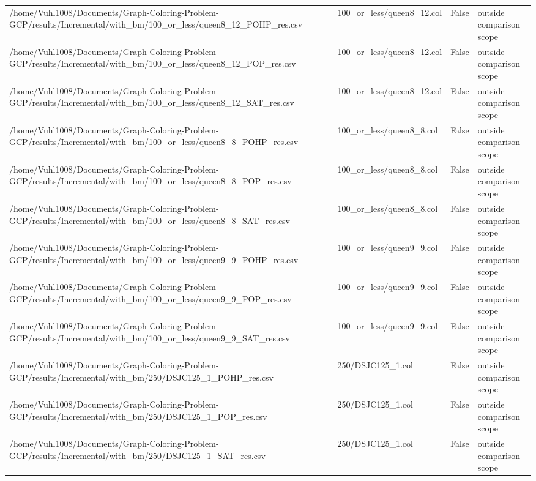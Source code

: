 \begin{table}[htbp]
\begin{tabular}{llll}
/home/Vuhl1008/Documents/Graph-Coloring-Problem-GCP/results/Incremental/with\_bm/100\_or\_less/queen8\_12\_POHP\_res.csv & 100\_or\_less/queen8\_12.col & False & outside comparison scope \\
/home/Vuhl1008/Documents/Graph-Coloring-Problem-GCP/results/Incremental/with\_bm/100\_or\_less/queen8\_12\_POP\_res.csv & 100\_or\_less/queen8\_12.col & False & outside comparison scope \\
/home/Vuhl1008/Documents/Graph-Coloring-Problem-GCP/results/Incremental/with\_bm/100\_or\_less/queen8\_12\_SAT\_res.csv & 100\_or\_less/queen8\_12.col & False & outside comparison scope \\
/home/Vuhl1008/Documents/Graph-Coloring-Problem-GCP/results/Incremental/with\_bm/100\_or\_less/queen8\_8\_POHP\_res.csv & 100\_or\_less/queen8\_8.col & False & outside comparison scope \\
/home/Vuhl1008/Documents/Graph-Coloring-Problem-GCP/results/Incremental/with\_bm/100\_or\_less/queen8\_8\_POP\_res.csv & 100\_or\_less/queen8\_8.col & False & outside comparison scope \\
/home/Vuhl1008/Documents/Graph-Coloring-Problem-GCP/results/Incremental/with\_bm/100\_or\_less/queen8\_8\_SAT\_res.csv & 100\_or\_less/queen8\_8.col & False & outside comparison scope \\
/home/Vuhl1008/Documents/Graph-Coloring-Problem-GCP/results/Incremental/with\_bm/100\_or\_less/queen9\_9\_POHP\_res.csv & 100\_or\_less/queen9\_9.col & False & outside comparison scope \\
/home/Vuhl1008/Documents/Graph-Coloring-Problem-GCP/results/Incremental/with\_bm/100\_or\_less/queen9\_9\_POP\_res.csv & 100\_or\_less/queen9\_9.col & False & outside comparison scope \\
/home/Vuhl1008/Documents/Graph-Coloring-Problem-GCP/results/Incremental/with\_bm/100\_or\_less/queen9\_9\_SAT\_res.csv & 100\_or\_less/queen9\_9.col & False & outside comparison scope \\
/home/Vuhl1008/Documents/Graph-Coloring-Problem-GCP/results/Incremental/with\_bm/250/DSJC125\_1\_POHP\_res.csv & 250/DSJC125\_1.col & False & outside comparison scope \\
/home/Vuhl1008/Documents/Graph-Coloring-Problem-GCP/results/Incremental/with\_bm/250/DSJC125\_1\_POP\_res.csv & 250/DSJC125\_1.col & False & outside comparison scope \\
/home/Vuhl1008/Documents/Graph-Coloring-Problem-GCP/results/Incremental/with\_bm/250/DSJC125\_1\_SAT\_res.csv & 250/DSJC125\_1.col & False & outside comparison scope \\

\end{tabular}
\end{table}

